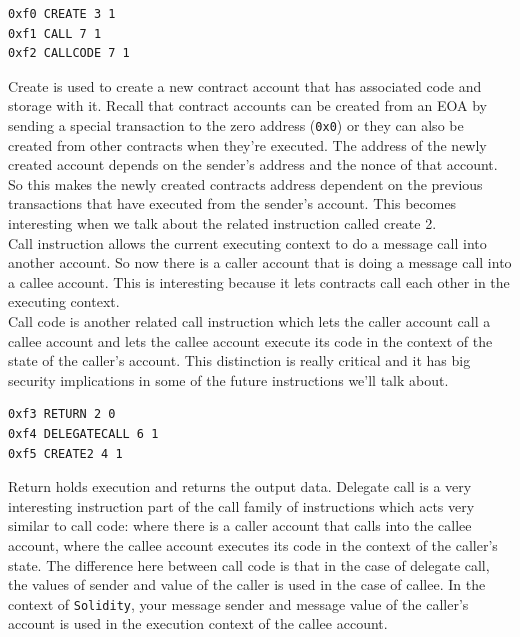 \begin{lstlisting}[style=defaultStyle, caption={Create, call and call code instructions.}]
0xf0 CREATE 3 1
0xf1 CALL 7 1
0xf2 CALLCODE 7 1
\end{lstlisting}

Create is used to create a new contract account that has associated code and storage with it.
Recall that contract accounts can be created from an EOA by sending a special transaction to the zero address (\texttt{0x0}) or they can also be created from other contracts when they're executed.
The address of the newly created account depends on the sender's address and the nonce of that account.
So this makes the newly created contracts address dependent on the previous transactions that have executed from the sender's account.
This becomes interesting when we talk about the related instruction called create 2.\\

Call instruction allows the current executing context to do a message call into another account.
So now there is a caller account that is doing a message call into a callee account.
This is interesting because it lets contracts call each other in the executing context.\\

Call code is another related call instruction which lets the caller account call a callee account and lets the callee account execute its code in the context of the state of the caller's account.
This distinction is really critical and it has big security implications in some of the future instructions we'll talk about.

\begin{lstlisting}[style=defaultStyle, caption={Return, delegate call and create 2 instructions.}]
0xf3 RETURN 2 0
0xf4 DELEGATECALL 6 1
0xf5 CREATE2 4 1
\end{lstlisting}

Return holds execution and returns the output data.
Delegate call is a very interesting instruction part of the call family of instructions which acts very similar to call code: where there is a caller account that calls into the callee account, where the callee account executes its code in the context of the caller's state.
The difference here between call code is that in the case of delegate call, the values of sender and value of the caller is used in the case of callee.
In the context of \texttt{Solidity}, your message sender and message value of the caller's account is used in the execution context of the callee account.\\

